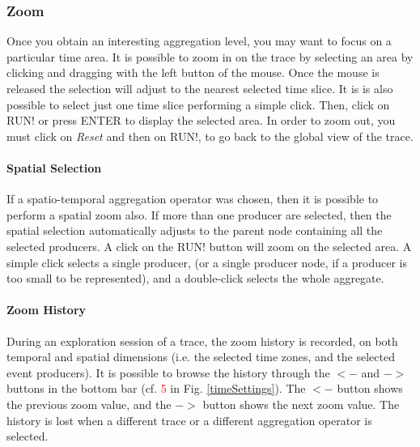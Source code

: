 \documentclass[twoside]{article}
\begin{document}
\begin{sloppypar}
\subsubsection{Zoom}
Once you obtain an interesting aggregation level, you may want to focus on a particular time area. It is possible to zoom in on the trace by selecting an area by clicking and dragging with the left button of the mouse. Once the mouse is released the selection will adjust to the nearest selected time slice. It is is also possible to select just one time slice performing a simple click. Then, click on RUN! or press ENTER to display the selected area. In order to zoom out, you must click on \textit{Reset} and then on RUN!, to go back to the global view of the trace.

\paragraph{Spatial Selection}
If a spatio-temporal aggregation operator was chosen, then it is possible to perform a spatial zoom also. If more than one producer are selected, then the spatial selection automatically adjusts to the parent node containing all the selected producers. A click on the RUN! button will zoom on the selected area. A simple click selects a single producer, (or a single producer node, if a producer is too small to be represented), and a double-click selects the whole aggregate.

\paragraph{Zoom History}
During an exploration session of a trace, the zoom history is recorded, on both temporal and spatial dimensions (i.e. the selected time zones, and the selected event producers). It is possible to browse the history through the $<-$ and $->$ buttons in the bottom bar (cf. \textcolor{red}{5} in Fig. \ref{timeSettings}). The $<-$ button shows the previous zoom value, and the $->$ button shows the next zoom value. The history is lost when a different trace or a different aggregation operator is selected.


\end{sloppypar}
\end{document}
